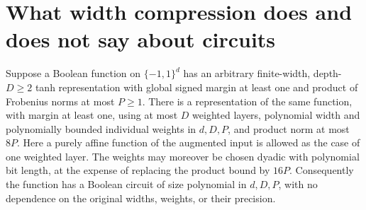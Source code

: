 \section{What width compression does and does not say about circuits}
\label{sec:product-normal-form}

\begin{corollary}
\label{cor:product-finite-description}
Suppose a Boolean function on $\{-1,1\}^d$ has an arbitrary finite-width,
depth-$D\ge2$ tanh representation with global signed margin at least one
and product of Frobenius norms at most $P\ge1$. There is a representation
of the same function, with margin at least one, using at most $D$
weighted layers, polynomial width and polynomially bounded individual
weights in $d,D,P$, and product norm at most $8P$.
Here a purely affine function of the augmented input is allowed as the
case of one weighted layer. The weights may moreover be chosen dyadic
with polynomial bit length, at the expense of replacing the product
bound by $16P$. Consequently the function has a Boolean circuit of size
polynomial in $d,D,P$, with no dependence on the original widths,
weights, or their precision.
\end{corollary}

